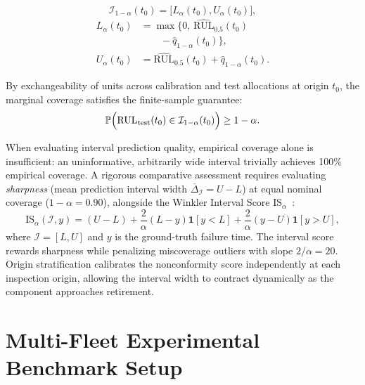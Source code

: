 \documentclass[a4paper,fleqn]{cas-dc}
\newcommand{\RUL}{\mathrm{RUL}}
\begin{document}
\begin{equation}
\label{eq:conformal_interval}
\mathcal{I}_{1-\alpha}(t_0)
=\bigl[L_\alpha(t_0),U_\alpha(t_0)\bigr],
\end{equation}
\begin{equation}
\begin{aligned}
L_\alpha(t_0)
&=\max\bigl\{0,\,
\widehat{\RUL}_{0.5}(t_0)\\
&\qquad-\hat{q}_{1-\alpha}(t_0)\bigr\},\\
U_\alpha(t_0)
&=\widehat{\RUL}_{0.5}(t_0)
+\hat{q}_{1-\alpha}(t_0).
\end{aligned}
\end{equation}


By exchangeability of units across calibration and test allocations at origin $t_0$, the marginal coverage satisfies the finite-sample guarantee:
\begin{equation}
    \mathbb{P}\Bigl(\RUL_{\mathrm{test}}(t_0) \in \mathcal{I}_{1-\alpha}(t_0)\Bigr) \ge 1 - \alpha.
    \label{eq:coverage_guarantee}
\end{equation}

When evaluating interval prediction quality, empirical coverage alone is insufficient: an uninformative, arbitrarily wide interval trivially achieves 100\% empirical coverage. A rigorous comparative assessment requires evaluating \emph{sharpness} (mean prediction interval width $\overline{\Delta}_{\mathcal{I}} = U - L$) at equal nominal coverage ($1 - \alpha = 0.90$), alongside the Winkler Interval Score $\mathrm{IS}_\alpha$~\cite{Winkler_1972, Gneiting_2007}:
\begin{equation}
    \mathrm{IS}_\alpha(\mathcal{I}, y) = (U - L) + \frac{2}{\alpha}(L - y)\mathbf{1}[y < L] + \frac{2}{\alpha}(y - U)\mathbf{1}[y > U],
    \label{eq:interval_score}
\end{equation}
where $\mathcal{I} = [L, U]$ and $y$ is the ground-truth failure time. The interval score rewards sharpness while penalizing miscoverage outliers with slope $2/\alpha = 20$. Origin stratification calibrates the nonconformity score independently at each inspection origin, allowing the interval width to contract dynamically as the component approaches retirement.

\section{Multi-Fleet Experimental Benchmark Setup}
\label{sec:experiments}
\end{document}
